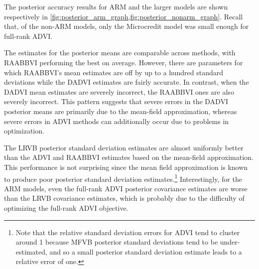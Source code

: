The posterior accuracy results for ARM and the larger models are shown
respectively in \cref{fig:posterior_arm_graph,fig:posterior_nonarm_graph}. Recall that,
of
the non-ARM models, only the Microcredit model was small enough for full-rank
ADVI.

The estimates for the posterior means are comparable across methods, with
RAABBVI performing the best on average.  However, there are parameters for which
RAABBVI's mean estimates are off by up to a hundred standard deviations while
the DADVI estimates are fairly accurate.  In contrast, when the DADVI mean
estimates are severely incorrect, the RAABBVI ones are also severely incorrect.
This pattern suggests that severe errors in the DADVI posterior means are
primarily due to the mean-field approximation, whereas severe errors in ADVI
methods can additionally occur due to problems in optimization.

The LRVB posterior standard deviation estimates are almost uniformly better than
the ADVI and RAABBVI estimates based on the mean-field approximation. This
performance is not surprising since the mean field approximation is known to
produce poor posterior standard deviation estimates.\footnote{Note that the
relative standard deviation errors for ADVI tend to cluster around 1 because
MFVB posterior standard deviations tend to be under-estimated, and so a small
posterior standard deviation estimate leads to a relative error of one.}
Interestingly, for the ARM models, even the full-rank ADVI posterior covariance
estimates are worse than the LRVB covariance estimates, which is probably due to
the difficulty of optimizing the full-rank ADVI objective.
